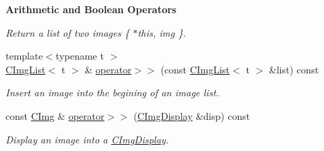\begin{Indent}{\bf Arithmetic and Boolean Operators}
\begin{DoxyCompactItemize}
\begin{DoxyCompactList}\small\item\em Return a list of two images \{ $\ast$this, img \}. \end{DoxyCompactList}\item 
\hypertarget{structcimg__library_1_1_c_img_aadaaacad92ffb618134cbeb5538e0ab5}{{\footnotesize template$<$typename t $>$ }\\\hyperlink{structcimg__library_1_1_c_img_list}{C\-Img\-List}$<$ t $>$ \& \hyperlink{structcimg__library_1_1_c_img_aadaaacad92ffb618134cbeb5538e0ab5}{operator$>$$>$} (const \hyperlink{structcimg__library_1_1_c_img_list}{C\-Img\-List}$<$ t $>$ \&list) const }\label{structcimg__library_1_1_c_img_aadaaacad92ffb618134cbeb5538e0ab5}

\begin{DoxyCompactList}\small\item\em Insert an image into the begining of an image list. \end{DoxyCompactList}\item 
\hypertarget{structcimg__library_1_1_c_img_ad121574a02d9105c957c14d71dae898e}{const \hyperlink{structcimg__library_1_1_c_img}{C\-Img} \& \hyperlink{structcimg__library_1_1_c_img_ad121574a02d9105c957c14d71dae898e}{operator$>$$>$} (\hyperlink{structcimg__library_1_1_c_img_display}{C\-Img\-Display} \&disp) const }\label{structcimg__library_1_1_c_img_ad121574a02d9105c957c14d71dae898e}

\begin{DoxyCompactList}\small\item\em Display an image into a \hyperlink{structcimg__library_1_1_c_img_display}{C\-Img\-Display}. \end{DoxyCompactList}\end{DoxyCompactItemize}
\end{Indent}
